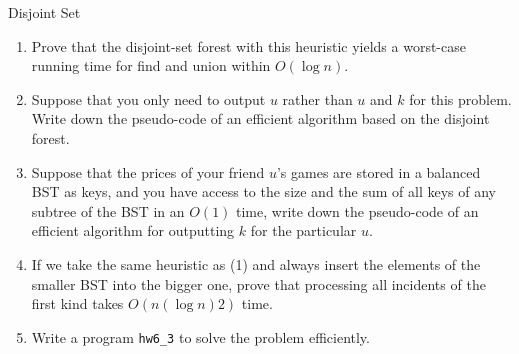 \begin{homeworkProblem}{Disjoint Set}
    \begin{enumerate}[label=(\arabic*)]
        \item
            Prove that the disjoint-set forest with this heuristic yields a 
            worst-case running time for find and union within $O(\log n)$.

            \pending

        \item
            Suppose that you only need to output $u$ rather than $u$ and $k$ for
            this problem. Write down the pseudo-code of an efficient algorithm
            based on the disjoint forest.

            \pending

        \item
            Suppose that the prices of your friend $u$'s games are stored in a
            balanced BST as keys, and you have access to the size and the sum of
            all keys of any subtree of the BST in an $O(1)$ time, write down the
            pseudo-code of an efficient algorithm for outputting $k$ for the 
            particular $u$.

            \pending

        \item
            If we take the same heuristic as (1) and always insert the elements
            of the smaller BST into the bigger one, prove that processing all
            incidents of the first kind takes $O(n(\log n) 2)$ time.

            \pending

        \item Write a program \texttt{hw6\_3} to solve the problem efficiently.


    \end{enumerate}
\end{homeworkProblem}


